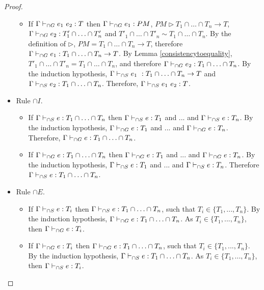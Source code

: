 \documentclass[a4paper]{article}
\begin{document}
\begin{proof}
\begin{itemize}
\begin{itemize}
        \item If $\Gamma \vdash_{\cap G} e_1\ e_2 : T$ then $\Gamma \vdash_{\cap G} e_1 : PM$, $PM \rhd T_1 \cap \ldots \cap T_n \rightarrow T$, $\Gamma \vdash_{\cap G} e_2 : T'_1 \cap \ldots \cap T'_n$ and $T'_1 \cap \ldots \cap T'_n \sim T_1 \cap \ldots \cap T_n$.
        By the definition of $\rhd$, $PM = T_1 \cap \ldots \cap T_n \rightarrow T$, therefore $\Gamma \vdash_{\cap G} e_1 : T_1 \cap \ldots \cap T_n \rightarrow T$.
        By Lemma \ref{consistencytoequality}, $T'_1 \cap \ldots \cap T'_n = T_1 \cap \ldots \cap T_n$, and therefore $\Gamma \vdash_{\cap G} e_2 : T_1 \cap \ldots \cap T_n$.
        By the induction hypothesis, $\Gamma \vdash_{\cap S} e_1\ : T_1 \cap \ldots \cap T_n \rightarrow T$ and $\Gamma \vdash_{\cap S} e_2 : T_1 \cap \ldots \cap T_n$.
        Therefore, $\Gamma \vdash_{\cap S} e_1\ e_2 : T$.
    \end{itemize}
    \item Rule ${\cap} I$.
    \begin{itemize}
        \item If $\Gamma \vdash_{\cap S} e : T_1 \cap \ldots \cap T_n$ then $\Gamma \vdash_{\cap S} e : T_1$ and ... and $\Gamma \vdash_{\cap S} e : T_n$.
        By the induction hypothesis, $\Gamma \vdash_{\cap G} e : T_1$ and ... and $\Gamma \vdash_{\cap G} e : T_n$.
        Therefore, $\Gamma \vdash_{\cap G} e : T_1 \cap \ldots \cap T_n$.
        \item If $\Gamma \vdash_{\cap G} e : T_1 \cap \ldots \cap T_n$ then $\Gamma \vdash_{\cap G} e : T_1$ and ... and $\Gamma \vdash_{\cap G} e : T_n$.
        By the induction hypothesis, $\Gamma \vdash_{\cap S} e : T_1$ and ... and $\Gamma \vdash_{\cap S} e : T_n$.
        Therefore $\Gamma \vdash_{\cap S} e : T_1 \cap \ldots \cap T_n$.
    \end{itemize}
    \item Rule ${\cap} E$.
    \begin{itemize}
        \item If $\Gamma \vdash_{\cap S} e : T_i$ then $\Gamma \vdash_{\cap S} e : T_1 \cap \ldots \cap T_n$, such that $T_i \in \{T_1, ..., T_n\}$.
        By the induction hypothesis, $\Gamma \vdash_{\cap G} e : T_1 \cap \ldots \cap T_n$.
        As $T_i \in \{T_1, ..., T_n\}$, then $\Gamma \vdash_{\cap G} e : T_i$.
        \item If $\Gamma \vdash_{\cap G} e : T_i$ then $\Gamma \vdash_{\cap G} e : T_1 \cap \ldots \cap T_n$, such that $T_i \in \{T_1, ..., T_n\}$.
        By the induction hypothesis, $\Gamma \vdash_{\cap S} e : T_1 \cap \ldots \cap T_n$.
        As $T_i \in \{T_1, ..., T_n\}$, then $\Gamma \vdash_{\cap S} e : T_i$.
    \end{itemize}
\end{itemize}
\end{proof}
\end{document}
